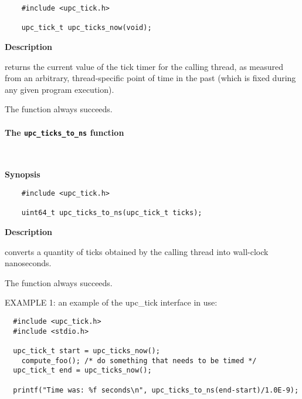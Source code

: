 \npf\vspace{-2.5em}
 \begin{verbatim}
    #include <upc_tick.h>

    upc_tick_t upc_ticks_now(void);
\end{verbatim}

{\bf Description}

 returns the current value of the tick timer for the calling thread,
as measured from an arbitrary, thread-specific point of time in the past (which is fixed
during any given program execution).

\np The function always succeeds.

\paragraph{The {\tt upc\_ticks\_to\_ns} function}\ \\
\label{upc-ticks-to-ns}

{\bf Synopsis}

\npf\vspace{-2.5em}
 \begin{verbatim}
    #include <upc_tick.h>

    uint64_t upc_ticks_to_ns(upc_tick_t ticks);
\end{verbatim}

{\bf Description}

 converts a quantity of ticks obtained by the
calling thread into wall-clock nanoseconds.

\np The function always succeeds.

\np EXAMPLE 1: an example of the upc\_tick interface in use:
\begin{verbatim}
  #include <upc_tick.h>
  #include <stdio.h>

  upc_tick_t start = upc_ticks_now();
    compute_foo(); /* do something that needs to be timed */
  upc_tick_t end = upc_ticks_now();

  printf("Time was: %f seconds\n", upc_ticks_to_ns(end-start)/1.0E-9);
\end{verbatim}

\cbend
